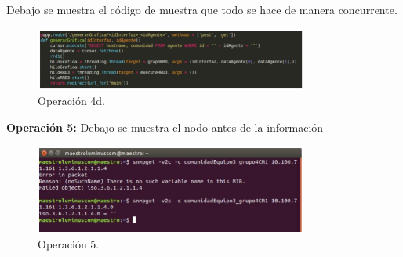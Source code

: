 \noindent
Debajo se muestra el código de muestra que todo se hace de manera concurrente.  

\begin{figure}[htbp!]
	\centering
		\includegraphics[width=0.8\textwidth]{images/tarea3/op4d}
	\caption{Operación 4d.}
\end{figure}

\noindent
\textbf{Operación 5:} Debajo se muestra el nodo antes de la información  

\begin{figure}[htbp!]
	\centering
		\includegraphics[width=0.8\textwidth]{images/tarea3/op5}
	\caption{Operación 5.}
\end{figure}
